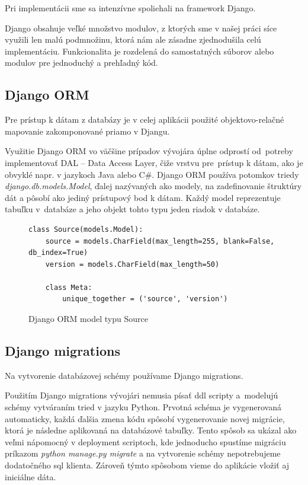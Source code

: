 Pri implementácii sme sa intenzívne spoliehali na framework \mbox{Django}.
\par Django obsahuje veľké množstvo modulov, z ktorých sme v našej práci síce využili len malú podmnožinu, ktorá nám ale zásadne zjedno\-dušila celú implementáciu. Funkcionalita je rozdelená do samostatných súborov alebo modulov pre jednoduchý a prehľadný kód.

\subsection{Django ORM}
Pre prístup k dátam z databázy je v celej aplikácii použité objektovo-relačné mapovanie zakomponované priamo v Djangu.
\par Využitie Django ORM vo väčšine prípadov vývojára úplne odprostí od~potreby implementovať DAL -- Data Access Layer, čiže vrstvu pre~prístup k dátam, ako je obvyklé napr. v jazykoch Java alebo C\#. Django ORM používa potomkov triedy \emph{django.db.models.Model}, ďalej nazývaných ako modely, na zadefinovanie štruktúry dát a pôsobí ako je\-diný prístupový bod k dátam. Každý model reprezentuje tabuľku v~databáze a jeho objekt tohto typu jeden riadok v databáze.

\begin{figure}[htbp]
\centering
\begin{minipage}{0.9\textwidth}
\lstset{tabsize=4,columns=flexible,breaklines=true,breakatwhitespace=true, showstringspaces=false}
\begin{lstlisting}
class Source(models.Model):
    source = models.CharField(max_length=255, blank=False, db_index=True)
    version = models.CharField(max_length=50)

    class Meta:
        unique_together = ('source', 'version')
\end{lstlisting} 		
\end{minipage} 
\caption{Django ORM model typu Source}
\label{fig:static-analysis}
\end{figure}

\subsection{Django migrations}
Na vytvorenie databázovej schémy používame Django migrations.
\par Použitím Django migrations vývojári nemusia písať ddl scripty a~modelujú schémy vytváraním tried v jazyku Python. Prvotná schéma je vygenerovaná automaticky, každá ďalšia zmena kódu spôsobí vyge\-nerovanie novej migrácie, ktorá je následne aplikovaná na databázové tabuľky. Tento spôsob sa ukázal ako veľmi nápomocný v deployment scriptoch, kde jednoducho spustíme migráciu príkazom \emph{python ma\-nage.py migrate} a na vytvorenie schémy nepotrebujeme dodatočného sql klienta. Zároveň týmto spôsobom vieme do aplikácie vložiť aj iniciálne dáta.

